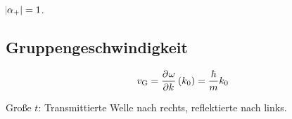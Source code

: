 $\abs{\alpha_+} = 1$.

\subsection{Gruppengeschwindigkeit}

\[
	v_\text G = \dpd \omega k \del{k_0}
	= \frac\hbar m k_0
\]

Große $t$: Transmittierte Welle nach rechts, reflektierte nach links.


\IfFileExists{\bibliographyfile}{
}{}




